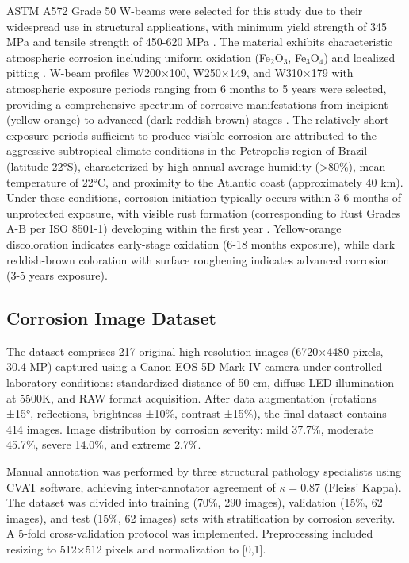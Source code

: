 \documentclass[Journal,letterpaper]{ascelike-new}
\begin{document}
ASTM A572 Grade 50 W-beams were selected for this study due to their widespread use in structural applications, with minimum yield strength of 345 MPa and tensile strength of 450-620 MPa \cite{astm2018a572,aisc2016specification}. The material exhibits characteristic atmospheric corrosion including uniform oxidation (Fe$_2$O$_3$, Fe$_3$O$_4$) and localized pitting \cite{ahmad2006principles}. W-beam profiles W200×100, W250×149, and W310×179 with atmospheric exposure periods ranging from 6 months to 5 years were selected, providing a comprehensive spectrum of corrosive manifestations from incipient (yellow-orange) to advanced (dark reddish-brown) stages \cite{melchers2018structural}. The relatively short exposure periods sufficient to produce visible corrosion are attributed to the aggressive subtropical climate conditions in the Petropolis region of Brazil (latitude 22°S), characterized by high annual average humidity (>80\%), mean temperature of 22°C, and proximity to the Atlantic coast (approximately 40 km). Under these conditions, corrosion initiation typically occurs within 3-6 months of unprotected exposure, with visible rust formation (corresponding to Rust Grades A-B per ISO 8501-1) developing within the first year \cite{perez2013more}. Yellow-orange discoloration indicates early-stage oxidation (6-18 months exposure), while dark reddish-brown coloration with surface roughening indicates advanced corrosion (3-5 years exposure).

\subsection{Corrosion Image Dataset}
\label{subsec:dataset}

The dataset comprises 217 original high-resolution images (6720×4480 pixels, 30.4 MP) captured using a Canon EOS 5D Mark IV camera under controlled laboratory conditions: standardized distance of 50 cm, diffuse LED illumination at 5500K, and RAW format acquisition. After data augmentation (rotations ±15°, reflections, brightness ±10\%, contrast ±15\%), the final dataset contains 414 images. Image distribution by corrosion severity: mild 37.7\%, moderate 45.7\%, severe 14.0\%, and extreme 2.7\%.

Manual annotation was performed by three structural pathology specialists using CVAT software, achieving inter-annotator agreement of $\kappa = 0.87$ (Fleiss' Kappa). The dataset was divided into training (70\%, 290 images), validation (15\%, 62 images), and test (15\%, 62 images) sets with stratification by corrosion severity. A 5-fold cross-validation protocol was implemented. Preprocessing included resizing to 512×512 pixels and normalization to [0,1].
\end{document}
